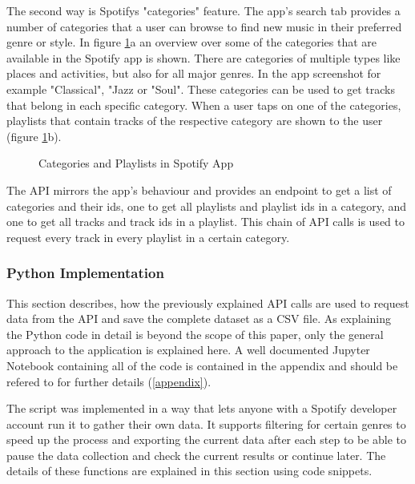 The second way is Spotifys "categories" feature. The app's search tab provides a number of
categories that a user can browse to find new music in their preferred genre or style.
In figure \ref{fig:Categories and Playlists in Spotify App}a an overview over some of the categories
that are available in the Spotify app is shown. There are categories of multiple types like
places and activities, but also for all major genres. In the app screenshot
for example "Classical", "Jazz or "Soul".
These categories can be used to get tracks that belong in each specific category. When a user taps on
one of the categories, playlists that contain tracks of the respective category are shown to the user
(figure \ref{fig:Categories and Playlists in Spotify App}b).

\begin{figure}[H]
    \centering
    \qquad
    \caption{Categories and Playlists in Spotify App}%
    \label{fig:Categories and Playlists in Spotify App}%
\end{figure}

The API mirrors the app's behaviour and provides an endpoint to get a list of categories and their ids,
one to get all playlists and playlist ids in a category, and one to get all tracks and track ids in
a playlist. This chain of API calls is used to request every track in every playlist in a certain category.


\subsubsection{Python Implementation}

This section describes, how the previously explained API calls are used to request data from the API
and save the complete dataset as a CSV file.
As explaining the Python code in detail is beyond the scope of this paper, only the general 
approach to the application is explained here. 
A well documented Jupyter Notebook containing all of the code is contained in the appendix and should be
refered to for further details (\ref{appendix}).

The script was implemented in a way that lets anyone with a Spotify
developer account run it to gather their own data.
It supports filtering for certain genres to speed up the process and exporting the current data after each step
to be able to pause the data collection and check the current results or continue later.
The details of these functions are explained in this section using code snippets.

